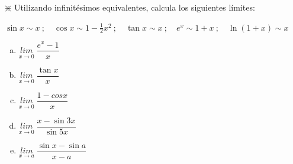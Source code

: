 	\begin{ejre} $\divideontimes$ Utilizando infinitésimos equivalentes, calcula los siguientes límites:
	
	$\sin x \sim x\:; \quad \cos x \sim 1 - \frac 1 2 x^2\:; \quad \tan x \sim x\:; \quad e^x	 \sim 1 + x\:; \quad \ln (1+x) \sim x$ 
	
		\begin{multicols}{2}
		
	\begin{enumerate} [a) ]
	\item $\underset {x \to 0 }{lim} \; {\dfrac {e^x-1} {x} }$
	\item $\underset {x\to 0 }{lim}\;{\dfrac {\tan x}{x}}$
	\item $\underset {x\to 0}{lim}\;{\dfrac {1-cos x}{x}}$
	\item $\underset {x\to 0 }{lim}\;{\dfrac {x-\sin 3x}{\sin 5x}}$
	\item $\underset {x\to a}{lim}\;{ \dfrac {\sin x - \sin a}{x-a} }$
	
	\end{enumerate}
	\end{multicols}
	\end{ejre}
	
	
	
